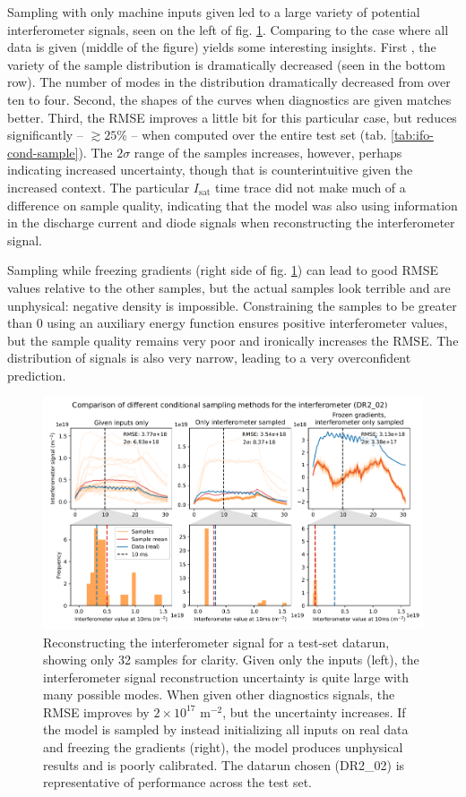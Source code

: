 Sampling with only machine inputs given led to a large variety of potential interferometer signals, seen on the left of fig. \ref{fig:ifo_sample}. Comparing to the case where all data is given (middle of the figure) yields some interesting insights. First , the variety of the sample distribution is dramatically decreased (seen in the bottom row). The number of modes in the distribution dramatically decreased from over ten to four. Second, the shapes of the curves when diagnostics are given matches better. Third, the RMSE improves a little bit for this particular case, but reduces significantly -- $\gtrsim 25$\% -- when computed over the entire test set (tab. \ref{tab:ifo-cond-sample}). The $2 \sigma$ range of the samples increases, however, perhaps indicating increased uncertainty, though that is counterintuitive given the increased context. The particular $I_\text{sat}$ time trace did not make much of a difference on sample quality, indicating that the model was also using information in the discharge current and diode signals when reconstructing the interferometer signal.

Sampling while freezing gradients (right side of fig. \ref{fig:ifo_sample}) can lead to good RMSE values relative to the other samples, but the actual samples look terrible and are unphysical: negative density is impossible. Constraining the samples to be greater than 0 using an auxiliary energy function ensures positive interferometer values, but the sample quality remains very poor and ironically increases the RMSE. The distribution of signals is also very narrow, leading to a very overconfident prediction. 

\begin{figure}
	\centering
	\includegraphics[width=\linewidth]{figures/interferometer_sampling_comp_39-0.pdf}
	\caption{\label{fig:ifo_sample}Reconstructing the interferometer signal for a test-set datarun, showing only 32 samples for clarity. Given only the inputs (left), the interferometer signal reconstruction uncertainty is quite large with many possible modes. When given other diagnostics signals, the RMSE improves by $2 \times 10^{17}$ m$^{-2}$, but the uncertainty increases. If the model is sampled by instead initializing all inputs on real data and freezing the gradients (right), the model produces unphysical results and is poorly calibrated. The datarun chosen (DR2\_02) is representative of performance across the test set. }
\end{figure}

